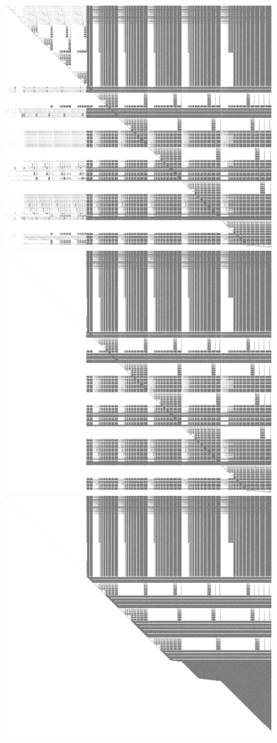 \documentclass[11pt]{beamer}
\begin{document}
\begin{frame}[allowframebreaks]
\begin{center}
\includegraphics[width=0.75\textwidth]{./hfe_25_5_echelonize_step_003.png}\\\framebreak
\includegraphics[width=0.75\textwidth]{./hfe_25_5_echelonize_step_004.png}\\\framebreak
\includegraphics[width=0.75\textwidth]{./hfe_25_5_echelonize_step_005.png}\\\framebreak
 \end{center}
\end{frame}
\end{document}
